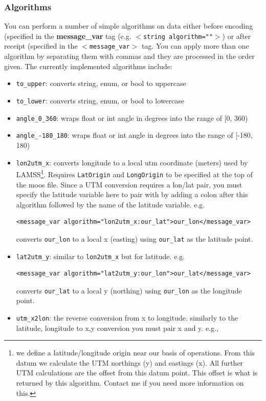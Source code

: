 \documentclass[11pt, letterpaper, oneside]{memoir}
\newcommand{\xmltag}[1]{\texttt{$<$#1$>$}}
\begin{document}
\subsubsection{Algorithms}
You can perform a number of simple algorithms on data either before encoding (specified in the \textbf{message\_var} tag (e.g. \xmltag{string algorithm=""}) or after receipt (specified in the \xmltag{message\_var} tag. You can apply more than one algorithm by separating them with commas and they are processed in the order given. The currently implemented algorithms include:
\begin{itemize}
\item \verb|to_upper|: converts string, enum, or bool to uppercase
\item \verb|to_lower|: converts string, enum, or bool to lowercase
\item \verb|angle_0_360|: wraps float or int angle in degrees into the range of [0, 360)
\item \verb|angle_-180_180|: wraps float or int angle in degrees into the range of [-180, 180)
\item \verb|lon2utm_x|: converts longitude to a local utm coordinate (meters) used by LAMSS\footnote{we define a latitude/longitude origin near our basis of operations. From this datum we calculate the UTM northings (y) and eastings (x). All further UTM calculations are the offset from this datum point. This offset is what is returned by this algorithm. Contact me if you need more information on this.}. Requires \verb|LatOrigin| and \verb|LongOrigin| to be specified at the top of the moos file. Since a UTM conversion requires a lon/lat pair, you must specify the latitude variable here to pair with by adding a colon after this algorithm followed by the name of the latitude variable. e.g.
\begin{verbatim}
<message_var algorithm="lon2utm_x:our_lat">our_lon</message_var>
\end{verbatim}
converts \verb|our_lon| to a local x (easting) using \verb|our_lat| as the latitude point.
\item \verb|lat2utm_y|: similar to \verb|lon2utm_x| but for latitude. e.g. 
\begin{verbatim}
<message_var algorithm="lat2utm_y:our_lon">our_lat</message_var>
\end{verbatim}
converts \verb|our_lat| to a local y (northing) using \verb|our_lon| as the longitude point.
\item \verb|utm_x2lon|: the reverse conversion from x to longitude. similarly to the latitude, longitude to x,y conversion you must pair x and y. e.g., 

\end{itemize}
\end{document}
